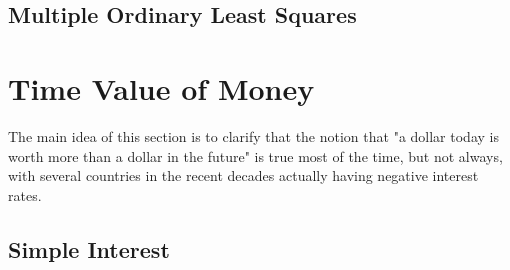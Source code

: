 \documentclass[12pt]{scrartcl}
\begin{document}
\subsection{Multiple Ordinary Least Squares}

\section{Time Value of Money}

The main idea of this section is to clarify that the notion that "a dollar today is worth more than a dollar in the future" is true most of the time, but not always, with several countries in the recent decades actually having negative interest rates.


\subsection{Simple Interest}
\end{document}
